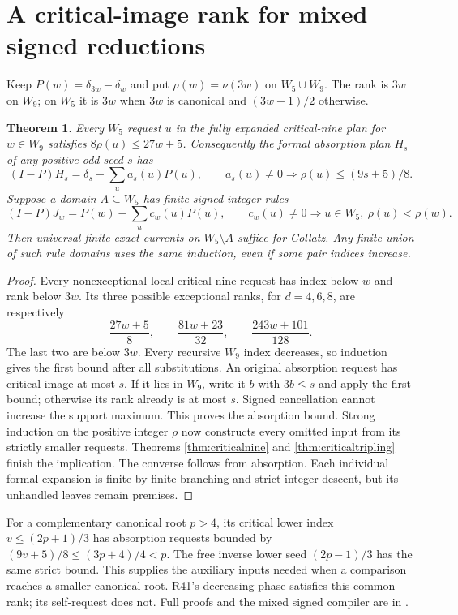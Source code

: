\documentclass[11pt]{article}
\newtheorem{theorem}{Theorem}
\begin{document}
\section{A critical-image rank for mixed signed reductions}
Keep $P(w)=\delta_{3w}-\delta_w$ and put $\rho(w)=\nu(3w)$ on
$W_5\cup W_9$. The rank is $3w$ on $W_9$; on $W_5$ it is $3w$
when $3w$ is canonical and $(3w-1)/2$ otherwise.

\begin{theorem}\label{thm:criticalrank}
Every $W_5$ request $u$ in the fully expanded critical-nine plan for
$w\in W_9$ satisfies $8\rho(u)\le27w+5$. Consequently the formal
absorption plan $H_s$ of any positive odd seed $s$ has
\[
 (I-P)H_s=\delta_s-\sum_u a_s(u)P(u),\qquad
 a_s(u)\ne0\Longrightarrow\rho(u)\le(9s+5)/8.
\]
Suppose a domain $A\subseteq W_5$ has finite signed integer rules
\[
 (I-P)J_w=P(w)-\sum_u c_w(u)P(u),\qquad
 c_w(u)\ne0\Longrightarrow u\in W_5,\ \rho(u)<\rho(w).
\]
Then universal finite exact currents on $W_5\setminus A$ suffice for
Collatz. Any finite union of such rule domains uses the same induction,
even if some pair indices increase.
\end{theorem}
\begin{proof}
Every nonexceptional local critical-nine request has index below $w$
and rank below $3w$. Its three possible exceptional ranks, for
$d=4,6,8$, are respectively
\[
 \frac{27w+5}{8},\qquad\frac{81w+23}{32},\qquad
 \frac{243w+101}{128}.
\]
The last two are below $3w$. Every recursive $W_9$ index decreases,
so induction gives the first bound after all substitutions. An original
absorption request has critical image at most $s$. If it lies in $W_9$,
write it $b$ with $3b\le s$ and apply the first bound; otherwise its rank
already is at most $s$. Signed cancellation cannot increase the support
maximum. This proves the absorption bound.
Strong induction on the positive integer $\rho$ now constructs every
omitted input from its strictly smaller requests. Theorems
\ref{thm:criticalnine} and \ref{thm:criticaltripling} finish the implication.
The converse follows from absorption. Each individual formal expansion
is finite by finite branching and strict integer descent, but its
unhandled leaves remain premises.
\end{proof}

For a complementary canonical root $p>4$, its critical lower index
$v\le(2p+1)/3$ has absorption requests bounded by
$(9v+5)/8\le(3p+4)/4<p$. The free inverse lower seed $(2p-1)/3$
has the same strict bound. This supplies the auxiliary inputs needed
when a comparison reaches a smaller canonical root. R41's decreasing
phase satisfies this common rank; its self-request does not.
Full proofs and the mixed signed compiler are in
.
\end{document}
